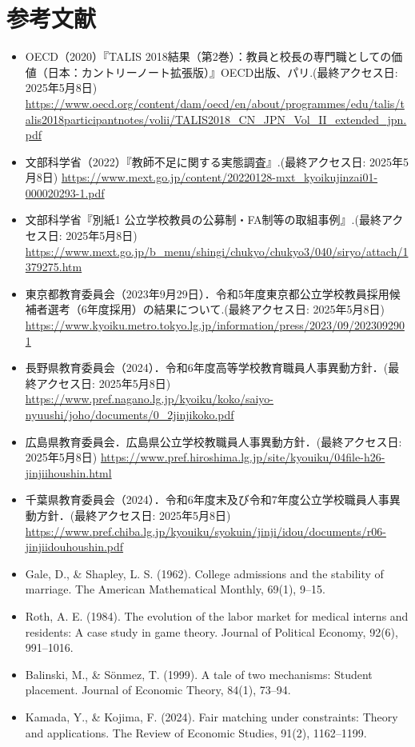 \documentclass[12pt, a4paper]{article}
\theoremstyle{definition}
\theoremstyle{remark}
\theoremstyle{plain}
\begin{document}
\section*{参考文献}




\begin{itemize}
    \item OECD（2020）『TALIS 2018結果（第2巻）：教員と校長の専門職としての価値（日本：カントリーノート拡張版）』OECD出版、パリ.(最終アクセス日: 2025年5月8日) \url{https://www.oecd.org/content/dam/oecd/en/about/programmes/edu/talis/talis2018participantnotes/volii/TALIS2018_CN_JPN_Vol_II_extended_jpn.pdf}
    \item 文部科学省（2022）『教師不足に関する実態調査』.(最終アクセス日: 2025年5月8日) \url{https://www.mext.go.jp/content/20220128-mxt_kyoikujinzai01-000020293-1.pdf}
    \item 文部科学省『別紙1 公立学校教員の公募制・FA制等の取組事例』.(最終アクセス日: 2025年5月8日) \url{https://www.mext.go.jp/b_menu/shingi/chukyo/chukyo3/040/siryo/attach/1379275.htm}
    \item 東京都教育委員会（2023年9月29日）．令和5年度東京都公立学校教員採用候補者選考（6年度採用）の結果について.(最終アクセス日: 2025年5月8日) \url{https://www.kyoiku.metro.tokyo.lg.jp/information/press/2023/09/2023092901}
    \item 長野県教育委員会（2024）．令和6年度高等学校教育職員人事異動方針．(最終アクセス日: 2025年5月8日) \url{https://www.pref.nagano.lg.jp/kyoiku/koko/saiyo-nyuushi/joho/documents/0_2jinjikoko.pdf}
    \item 広島県教育委員会．広島県公立学校教職員人事異動方針．(最終アクセス日: 2025年5月8日) \url{https://www.pref.hiroshima.lg.jp/site/kyouiku/04file-h26-jinjiihoushin.html}
    \item 千葉県教育委員会（2024）．令和6年度末及び令和7年度公立学校職員人事異動方針．(最終アクセス日: 2025年5月8日) \url{https://www.pref.chiba.lg.jp/kyouiku/syokuin/jinji/idou/documents/r06-jinjiidouhoushin.pdf}
    \item Gale, D., \& Shapley, L. S. (1962). College admissions and the stability of marriage. The American Mathematical Monthly, 69(1), 9–15.
    \item Roth, A. E. (1984). The evolution of the labor market for medical interns and residents: A case study in game theory. Journal of Political Economy, 92(6), 991–1016.
    \item Balinski, M., \& Sönmez, T. (1999). A tale of two mechanisms: Student placement. Journal of Economic Theory, 84(1), 73–94.
    \item Kamada, Y., \& Kojima, F. (2024). Fair matching under constraints: Theory and applications. The Review of Economic Studies, 91(2), 1162–1199.
\end{itemize}
\end{document}
